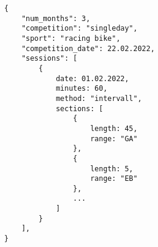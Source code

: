 \begin{minipage}{\linewidth}
\begin{lstlisting}
{ 
    "num_months": 3,
    "competition": "singleday",
    "sport": "racing bike",
    "competition_date": 22.02.2022,
    "sessions": [
        {
            date: 01.02.2022,
            minutes: 60,
            method: "intervall",
            sections: [
                {
                    length: 45,
                    range: "GA"
                },
                {
                    length: 5,
                    range: "EB"
                },
                ...
            ]
        }
    ], 
}
\end{lstlisting}
\end{minipage}



